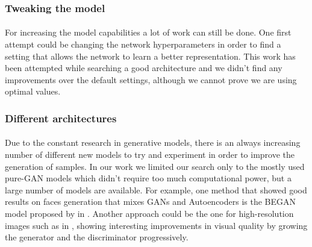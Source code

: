 \subsubsection{Tweaking the model}
\paragraph{} For increasing the model capabilities a lot of work can still be done. One first attempt could be changing the network hyperparameters in order to find a setting that allows the network to learn a better representation. This work has been attempted while searching a good architecture and we didn't find any improvements over the default settings, although we cannot prove we are using optimal values.

\subsubsection{Different architectures}
\paragraph{} Due to the constant research in generative models, there is an always increasing number of different new models to try and experiment in order to improve the generation of samples. In our work we limited our search only to the mostly used pure-GAN models which didn't require too much computational power, but a large number of models are available.
For example, one method that showed good results on faces generation that mixes GANs and Autoencoders is the BEGAN model proposed by \citeauthor{gan:BEGAN} in \cite{gan:BEGAN}. Another approach could be the one for high-resolution images such as in \textit{} \cite{gan:high-res}, showing interesting improvements in visual quality by growing the generator and the discriminator progressively.


